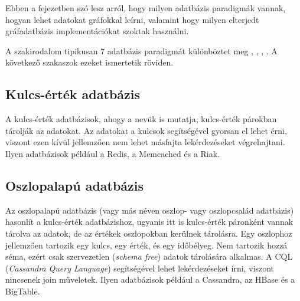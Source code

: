 
Ebben a fejezetben szó lesz arról, hogy milyen adatbázis paradigmák vannak, hogyan lehet adatokat gráfokkal leírni, valamint hogy milyen elterjedt gráfadatbázis implementációkat szoktak használni.




A szakirodalom tipikusan 7 adatbázis paradigmát különböztet meg \cite{paradigms}, \cite{nosql1}, \cite{nosql2}, \cite{nosql3}.
A következő szakaszok ezeket ismertetik röviden.

\subsection{Kulcs-érték adatbázis}

A kulcs-érték adatbázisok, ahogy a nevük is mutatja,  kulcs-érték párokban tárolják az adatokat. Az adatokat a kulcsok segítségével gyorsan el lehet érni, viszont ezen kívül jellemzően nem lehet másfajta lekérdezéseket végrehajtani. Ilyen adatbázisok például a Redis, a Memcached és a Riak.

\subsection{Oszlopalapú adatbázis}

Az oszlopalapú adatbázis (vagy más néven oszlop- vagy oszlopcsalád adatbázis) hasonlít a kulcs-érték adatbázishoz, ugyanis itt is kulcs-érték páronként vannak tárolva az adatok, de az értékek oszlopokban kerülnek tárolásra. Egy oszlophoz jellemzően tartozik egy kulcs, egy érték, és egy időbélyeg. Nem tartozik hozzá séma, ezért csak szervezetlen (\textit{schema free}) adatok tárolására alkalmas. A CQL (\textit{Cassandra Query Language}) segítségével lehet lekérdezéseket írni, viszont nincsenek join műveletek. Ilyen adatbázisok például a Cassandra, az HBase és a BigTable.

